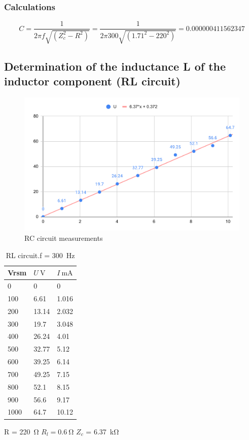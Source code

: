 \subsubsection*{Calculations}

\begin{equation}
C = \frac{1}{2\pi f \sqrt{(Z_c^2 - R^2)}} =
 \frac{1}{2\pi 300 \sqrt{(1.71^2 - 220^2)}} =
 0.000000411562347
\end{equation}






\subsection{Determination of the inductance L of the inductor component (RL circuit)}

\begin{figure}[H]
	\centering
	\includegraphics[width=14cm]{schematics/inductor.pdf}
	\caption{RC circuit measurements }
	\label{fig:inductance}
\end{figure}


\begin{table}[!ht]
    \centering
    \begin{tabular}{l|l|l}
        Vrsm & $U \SI{}{\volt}$ & $I \SI{}{\milli\ampere}$ \\ \hline
        0 & 0 & 0 \\ 
        100 & 6.61 & 1.016 \\ 
        200 & 13.14 & 2.032 \\ 
        300 & 19.7 & 3.048 \\ 
        400 & 26.24 & 4.01 \\ 
        500 & 32.77 & 5.12 \\ 
        600 & 39.25 & 6.14 \\ 
        700 & 49.25 & 7.15 \\ 
        800 & 52.1 & 8.15 \\ 
        900 & 56.6 & 9.17 \\ 
        1000 & 64.7 & 10.12 \\ 
    \end{tabular}
    \caption{RL circuit.f = \SI{300}{\hertz}} R = \SI{220}{\ohm} $R_l = \SI{0.6}{\ohm}$ $Z_c$ = \SI{6.37}{\kilo\ohm}
    \label{tab:capacitance}\end{table}

